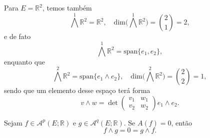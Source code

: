 \documentclass[../differential_forms.tex]{subfiles}
\begin{document}
\begin{example}
	Para \(E=\mathbb{R}^{2}\), temos também
	\[
		\bigwedge^{1}\mathbb{R}^{2} = \mathbb{R}^{2},\quad \mathrm{dim}\biggl(\bigwedge^{1}\mathbb{R}^{2} \biggr) = \binom{2}{1} = 2,
	\]
	e de fato
	\[
		\bigwedge^{1}\mathbb{R}^{2} = \mathrm{span}\{e_1, e_2\},
	\]
	enquanto que
	\[
		\bigwedge^{2}\mathbb{R}^{2} = \mathrm{span}\{e_1\wedge e_2\}, \quad \mathrm{dim}\biggl(\bigwedge^{2}\mathbb{R}^{2}\biggr) = \binom{2}{2}=1,
	\]
	sendo que um elemento desse espaço terá forma
	\[
		v\wedge w = \det{\begin{pmatrix}
				v_1 & w_1 \\
				v_2 & w_2
			\end{pmatrix}} e_1 \wedge e_2.
	\]
\end{example}

\begin{lemma*}
	Sejam \(f\in \mathcal{A}^{p}(E; \mathbb{R})\) e \(g\in \mathcal{A}^{q}(E; \mathbb{R})\). Se \(A(f) = 0 \), então
	\[
		f \wedge g = 0 = g \wedge f.
	\]
\end{lemma*}
\end{document}
